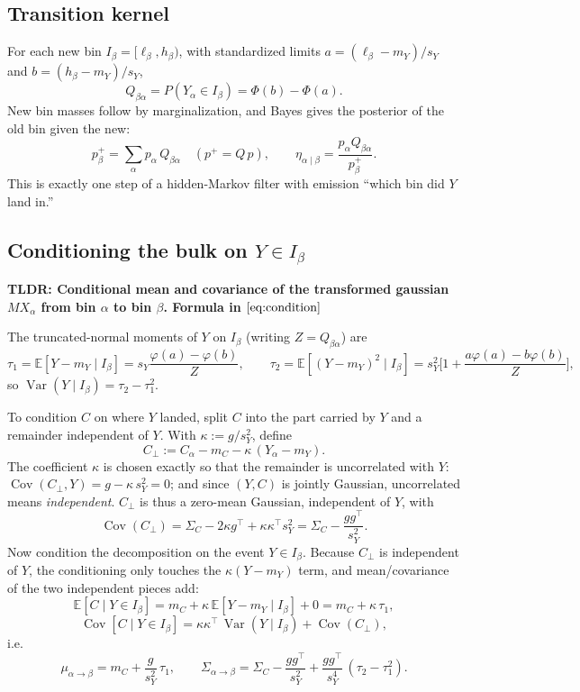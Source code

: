 \documentclass[11pt]{article}
\newcommand{\E}{\mathbb{E}}
\newcommand{\Var}{\operatorname{Var}}
\newcommand{\Cov}{\operatorname{Cov}}
\begin{document}
\subsection{Transition kernel}
For each new bin $I_\beta = [\ell_\beta, h_\beta)$, with standardized limits $a = (\ell_\beta - m_Y)/s_Y$ and $b = (h_\beta - m_Y)/s_Y$,
\[
Q_{\beta\alpha} = P(Y_\alpha \in I_\beta) = \Phi(b) - \Phi(a).
\]
New bin masses follow by marginalization, and Bayes gives the posterior of the old bin given the new:
\begin{equation}
p^+_\beta = \sum_\alpha p_\alpha\, Q_{\beta\alpha} \quad (p^+ = Q\,p), \qquad
\eta_{\alpha\mid\beta} = \frac{p_\alpha Q_{\beta\alpha}}{p^+_\beta}.
\label{eq:bayes}
\end{equation}
This is exactly one step of a hidden-Markov filter with emission ``which bin did $Y$ land in.''

\subsection{Conditioning the bulk on $Y \in I_\beta$}

\textbf{TLDR: Conditional mean and covariance of the transformed gaussian $MX_{\alpha}$ from bin $\alpha$ to bin $\beta$. Formula in $\ref{eq:condition}$}

The truncated-normal moments of $Y$ on $I_\beta$ (writing $Z = Q_{\beta\alpha}$) are
\[
\tau_1 = \E[Y - m_Y \mid I_\beta] = s_Y \frac{\varphi(a) - \varphi(b)}{Z}, \qquad
\tau_2 = \E[(Y - m_Y)^2 \mid I_\beta] = s_Y^2 \Big[ 1 + \frac{a\varphi(a) - b\varphi(b)}{Z} \Big],
\]
so $\Var(Y \mid I_\beta) = \tau_2 - \tau_1^2$.

To condition $C$ on where $Y$ landed, split $C$ into the part carried by $Y$ and a remainder independent of $Y$. With $\kappa := g / s_Y^2$, define
\[
C_\perp := C_\alpha - m_C - \kappa\,(Y_\alpha - m_Y).
\]
The coefficient $\kappa$ is chosen exactly so that the remainder is uncorrelated with $Y$:
$\Cov(C_\perp, Y) = g - \kappa\, s_Y^2 = 0$; and since $(Y, C)$ is jointly Gaussian, uncorrelated means \emph{independent}. $C_\perp$ is thus a zero-mean Gaussian, independent of $Y$, with
\[
\Cov(C_\perp) = \Sigma_C - 2\kappa g^\top + \kappa\kappa^\top s_Y^2 = \Sigma_C - \frac{g g^\top}{s_Y^2}.
\]
Now condition the decomposition on the event $Y \in I_\beta$. Because $C_\perp$ is independent of $Y$, the conditioning only touches the $\kappa (Y - m_Y)$ term, and mean/covariance of the two independent pieces add:
\[
\E[C \mid Y \in I_\beta] = m_C + \kappa\, \E[Y - m_Y \mid I_\beta] + 0
= m_C + \kappa\, \tau_1,
\]
\[
\Cov[C \mid Y \in I_\beta] = \kappa \kappa^\top\, \Var(Y \mid I_\beta) + \Cov(C_\perp),
\]
i.e.
\begin{equation}
\boxed{\;
\mu_{\alpha \to \beta} = m_C + \frac{g}{s_Y^2}\, \tau_1, \qquad
\Sigma_{\alpha \to \beta}
= \Sigma_C - \frac{g g^\top}{s_Y^2}
+ \frac{g g^\top}{s_Y^4}\,(\tau_2 - \tau_1^2) .
\;}
\label{eq:condition}
\end{equation}
\end{document}
